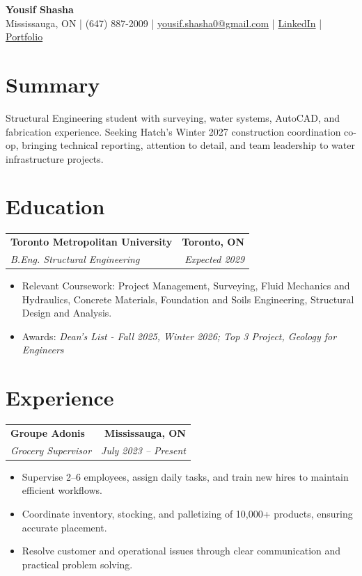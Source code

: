 \documentclass[11pt]{article}
\newcommand{\contact}[1]{\small #1}
\newcommand{\entry}[4]{%
  \begin{tabularx}{\textwidth}{X r}
    \textbf{#1} & \textbf{#2} \\
    \textit{#3} & \textit{#4} \\
  \end{tabularx}\vspace{-2pt}
}
\newcommand{\tightItem}[1]{\item \small #1}
\begin{document}
\begin{center}
{\LARGE \textbf{Yousif Shasha}}\\[4pt]
\contact{Mississauga, ON \;\;|\;\; (647) 887-2009 \;\;|\;\;
\href{mailto:yousif.shasha0@gmail.com}{yousif.shasha0@gmail.com} \;\;|\;\;
\href{https://www.linkedin.com/in/yousif-shasha-177412375}{LinkedIn}} 
\;\;|\;\;
\href{https://yousifshasha.github.io/Yousif-Shasha.github.io/}
{Portfolio}

\end{center}

\vspace{-4pt}

\section*{Summary}
\small{
Structural Engineering student with surveying, water systems, AutoCAD, and fabrication experience. Seeking Hatch's Winter 2027 construction coordination co-op, bringing technical reporting, attention to detail, and team leadership to water infrastructure projects.}

\section*{Education}
\entry
{Toronto Metropolitan University}{Toronto, ON}
{B.Eng. Structural Engineering}{Expected 2029}
\begin{itemize}
  \tightItem{Relevant Coursework: Project Management, Surveying, Fluid Mechanics and Hydraulics, Concrete Materials, Foundation and Soils Engineering, Structural Design and Analysis.}
  \tightItem{Awards: \textit{Dean's List - Fall 2025, Winter 2026; Top 3 Project, Geology for Engineers}}
\end{itemize}
\vspace{2pt}


\section*{Experience}
\entry
{Groupe Adonis}{Mississauga, ON}
{Grocery Supervisor }{July 2023 -- Present}
\begin{itemize}
  \tightItem{Supervise 2--6 employees, assign daily tasks, and train new hires to maintain efficient workflows.}
  \tightItem{Coordinate inventory, stocking, and palletizing of 10,000+ products, ensuring accurate placement.}
  \tightItem{Resolve customer and operational issues through clear communication and practical problem solving.}
  
\end{itemize}
\end{document}
